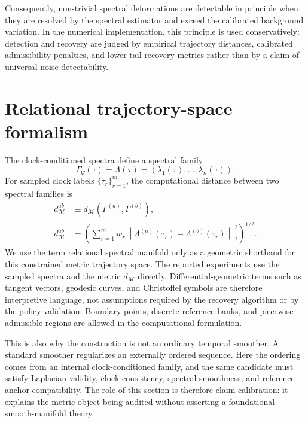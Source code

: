 \documentclass[11pt]{article}
\numberwithin{equation}{section}
\begin{document}
Consequently, non-trivial spectral deformations are detectable in principle when
they are resolved by the spectral estimator and exceed the calibrated background
variation. In the numerical implementation, this principle is used conservatively:
detection and recovery are judged by empirical trajectory distances, calibrated
admissibility penalties, and lower-tail recovery metrics rather than by a claim of
universal noise detectability.

\section{Relational trajectory-space formalism}

The clock-conditioned spectra define a spectral family
\begin{equation}
\Gamma_\Psi(\tau)=\Lambda(\tau)
=
(\lambda_1(\tau),\ldots,\lambda_n(\tau)).
\end{equation}
For sampled clock labels $\{\tau_r\}_{r=1}^m$, the computational distance between
two spectral families is
\begin{equation}
\begin{aligned}
d_{\mathcal M}^{ab}
&\equiv
d_{\mathcal M}(\Gamma^{(a)},\Gamma^{(b)}),\\
d_{\mathcal M}^{ab}
&=
\left(
\sum_{r=1}^{m}
w_r
\left\|
\Lambda^{(a)}(\tau_r)-\Lambda^{(b)}(\tau_r)
\right\|_2^2
\right)^{1/2}.
\end{aligned}
\end{equation}
We use the term relational spectral manifold only as a geometric shorthand for
this constrained metric trajectory space. The reported experiments use the
sampled spectra and the metric $d_{\mathcal M}$ directly. Differential-geometric
terms such as tangent vectors, geodesic curves, and Christoffel symbols are
therefore interpretive language, not assumptions required by the recovery
algorithm or by the policy validation. Boundary points, discrete reference banks,
and piecewise admissible regions are allowed in the computational formulation.

This is also why the construction is not an ordinary temporal smoother. A
standard smoother regularizes an externally ordered sequence. Here the ordering
comes from an internal clock-conditioned family, and the same candidate must
satisfy Laplacian validity, clock consistency, spectral smoothness, and
reference-anchor compatibility. The role of this section is therefore claim
calibration: it explains the metric object being audited without asserting a
foundational smooth-manifold theory.
\end{document}
